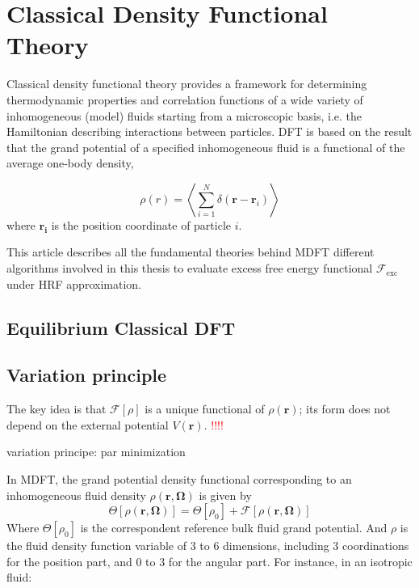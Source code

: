 
\chapter{Classical Density Functional Theory\label{chpt:mdft}}

Classical density functional theory provides a framework for determining
thermodynamic properties and correlation functions of a wide variety
of inhomogeneous (model) fluids starting from a microscopic basis,
i.e. the Hamiltonian describing interactions between particles. DFT
is based on the result that the grand potential of a specified inhomogeneous
fluid is a functional of the average one-body density,

\[
\rho(r)=\left\langle \sum_{i=1}^{N}\delta(\mathbf{r}-\mathbf{r}_{i})\right\rangle 
\]
where $\mathbf{r_{i}}$ is the position coordinate of particle $i$.

This article describes all the fundamental theories behind MDFT different
algorithms involved in this thesis to evaluate excess free energy
functional $\mathcal{F}_{\mathrm{exc}}$ under HRF approximation.


\section{Equilibrium Classical DFT}


\section{Variation principle}

The key idea is that $\mathcal{F}[\rho]$ is a unique functional of
$\rho(\mathbf{r})$; its form does not depend on the external potential
$V(\mathbf{r})$. \textcolor{red}{!!!!}

variation principe: par minimization

In \acf{MDFT}, the grand potential density functional corresponding
to an inhomogeneous fluid density $\rho(\mathbf{r},\mathbf{\Omega})$
is given by 
\begin{equation}
\Theta[\rho(\mathbf{r},\mathbf{\Omega})]=\Theta[\rho_{0}]+\mathcal{F}[\rho(\mathbf{r},\mathbf{\Omega})]
\end{equation}
Where $\Theta[\rho_{0}]$ is the correspondent reference bulk fluid
grand potential. And $\rho$ is the fluid density function variable
of 3 to 6 dimensions, including 3 coordinations for the position part,
and 0 to 3 for the angular part. For instance, in an isotropic fluid: 

